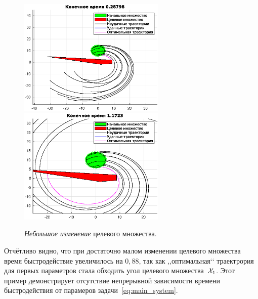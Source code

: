 \begin{figure}[h]
                \hfill
                \includegraphics[width=70mm]{program/t8n7.eps}
                \hfill
                \hfill
                \includegraphics[width=70mm]{program/t8n6.eps}
                \hfill
                \caption{\textit{Небольшое изменение} целевого множества.}
                \label{img:change_finish_set}
\end{figure}

Отчётливо видно, что при достаточно малом изменении целевого множества время быстродействие увеличилось на $0{,}88$, так как ,,оптимальная‘‘ траектрория для первых параметров стала обходить угол целевого множества~$\mathcal{X}_1$. Этот пример демонстрирует отсутствие непрерывной зависимости времени быстродействия от парамеров задачи~\eqref{eq:main_system}.